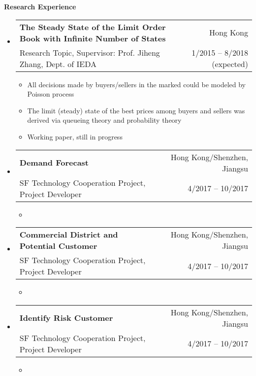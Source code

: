 \documentclass[letterpaper,10pt]{article}
\makeatletter
\newcommand{\resitem}[1]{\item #1 \vspace{-2pt}}
\newcommand{\resheading}[1]{{\large \colorbox{mygrey}{\begin{minipage}{\textwidth}{\textbf{#1 \vphantom{p\^{E}}}}\end{minipage}}}}
\newcommand{\ressubheading}[4]{
\begin{tabular*}{6.5in}{l@{\extracolsep{\fill}}r}
    \textbf{#1} & #2 \\
    #3 & #4 \\
\end{tabular*}\vspace{-6pt}}
\makeatother
\begin{document}
\resheading{Research Experience}
\begin{itemize}
\item
\ressubheading{The Steady State of the Limit Order Book with Infinite Number of States}{Hong Kong}{Research Topic, Supervisor: Prof. Jiheng Zhang, Dept. of IEDA}{1/2015 -- 8/2018 (expected)}
\begin{itemize}
\resitem{All decisions made by buyers/sellers in the marked could be modeled by Poisson process}
\resitem{The limit (steady) state of the best prices among buyers and sellers was derived via queueing theory and probability theory}
\resitem{Working paper, still in progress}
\end{itemize}


\item 
\ressubheading{Demand Forecast}{Hong Kong/Shenzhen, Jiangsu}{SF Technology Cooperation Project, Project Developer}{4/2017 -- 10/2017}
\begin{itemize}
\resitem{}
\end{itemize}


\item 
\ressubheading{Commercial District and Potential Customer}{Hong Kong/Shenzhen, Jiangsu}{SF Technology Cooperation Project, Project Developer}{4/2017 -- 10/2017}
\begin{itemize}
\resitem{}
\end{itemize}


\item 
\ressubheading{Identify Risk Customer}{Hong Kong/Shenzhen, Jiangsu}{SF Technology Cooperation Project, Project Developer}{4/2017 -- 10/2017}
\begin{itemize}
\resitem{}
\end{itemize}





\end{itemize}
\end{document}
